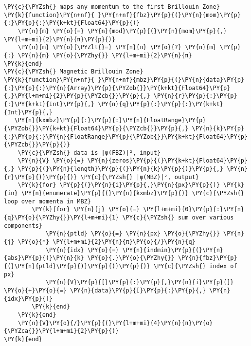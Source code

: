 \begin{Verbatim}[commandchars=\\\{\}]
\PY{c}{\PYZsh{} maps any momentum to the first Brillouin Zone}
\PY{k}{function}\PY{n+nf}{ }\PY{n+nf}{fbz}\PY{p}{(}\PY{n}{mom}\PY{p}{:}\PY{p}{:}\PY{k+kt}{Float64}\PY{p}{)}
    \PY{n}{m} \PY{o}{=} \PY{n}{mod}\PY{p}{(}\PY{n}{mom}\PY{p}{,} \PY{l+m+mi}{2}\PY{n}{π}\PY{p}{)}
    \PY{n}{m} \PY{o}{\PYZlt{}=} \PY{n}{π} \PY{o}{?} \PY{n}{m} \PY{p}{:} \PY{n}{m} \PY{o}{\PYZhy{}} \PY{l+m+mi}{2}\PY{n}{π}
\PY{k}{end}
\PY{c}{\PYZsh{} Magnetic Brillouin Zone}
\PY{k}{function}\PY{n+nf}{ }\PY{n+nf}{mbz}\PY{p}{(}\PY{n}{data}\PY{p}{:}\PY{p}{:}\PY{n}{Array}\PY{p}{\PYZob{}}\PY{k+kt}{Float64}\PY{p}{,}\PY{l+m+mi}{2}\PY{p}{\PYZcb{}}\PY{p}{,} \PY{n}{r}\PY{p}{:}\PY{p}{:}\PY{k+kt}{Int}\PY{p}{,} \PY{n}{q}\PY{p}{:}\PY{p}{:}\PY{k+kt}{Int}\PY{p}{,}
   \PY{n}{kxmbz}\PY{p}{:}\PY{p}{:}\PY{n}{FloatRange}\PY{p}{\PYZob{}}\PY{k+kt}{Float64}\PY{p}{\PYZcb{}}\PY{p}{,} \PY{n}{k}\PY{p}{:}\PY{p}{:}\PY{n}{FloatRange}\PY{p}{\PYZob{}}\PY{k+kt}{Float64}\PY{p}{\PYZcb{}}\PY{p}{)}
    \PY{c}{\PYZsh{} data is |ψ(FBZ)|², input}
    \PY{n}{V} \PY{o}{=} \PY{n}{zeros}\PY{p}{(}\PY{k+kt}{Float64}\PY{p}{,} \PY{p}{(}\PY{n}{length}\PY{p}{(}\PY{n}{k}\PY{p}{)}\PY{p}{,} \PY{n}{r}\PY{p}{)}\PY{p}{)} \PY{c}{\PYZsh{} |ψ(MBZ)|², output}
    \PY{k}{for} \PY{p}{(}\PY{n}{i}\PY{p}{,}\PY{n}{px}\PY{p}{)} \PY{k}{in} \PY{n}{enumerate}\PY{p}{(}\PY{n}{kxmbz}\PY{p}{)} \PY{c}{\PYZsh{} loop over momenta in MBZ}
        \PY{k}{for} \PY{n}{j} \PY{o}{=} \PY{l+m+mi}{0}\PY{p}{:}\PY{n}{q}\PY{o}{\PYZhy{}}\PY{l+m+mi}{1} \PY{c}{\PYZsh{} sum over various components}
            \PY{n}{ptld} \PY{o}{=} \PY{n}{px} \PY{o}{\PYZhy{}} \PY{n}{j} \PY{o}{*} \PY{l+m+mi}{2}\PY{n}{π}\PY{o}{/}\PY{n}{q}
            \PY{n}{idx} \PY{o}{=} \PY{n}{indmin}\PY{p}{(}\PY{n}{abs}\PY{p}{(}\PY{n}{k} \PY{o}{.}\PY{o}{\PYZhy{}} \PY{n}{fbz}\PY{p}{(}\PY{n}{ptld}\PY{p}{)}\PY{p}{)}\PY{p}{)} \PY{c}{\PYZsh{} index of px}
            \PY{n}{V}\PY{p}{[}\PY{p}{:}\PY{p}{,}\PY{n}{i}\PY{p}{]} \PY{o}{+}\PY{o}{=} \PY{n}{data}\PY{p}{[}\PY{p}{:}\PY{p}{,} \PY{n}{idx}\PY{p}{]}
        \PY{k}{end}
    \PY{k}{end}
    \PY{n}{V}\PY{o}{/}\PY{p}{(}\PY{l+m+mi}{4}\PY{n}{π}\PY{o}{\PYZca{}}\PY{l+m+mi}{2}\PY{p}{)}
\PY{k}{end}


\end{Verbatim}
